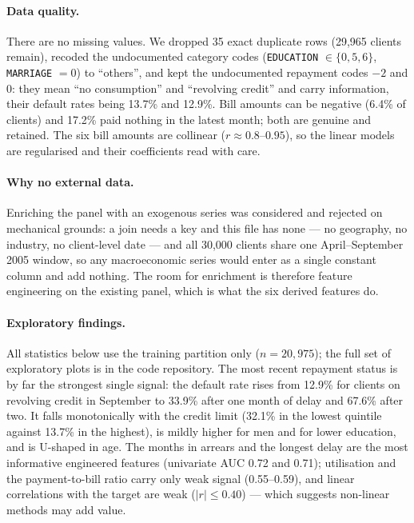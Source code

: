 \documentclass{article}
\begin{document}
\paragraph{Data quality.}
There are no missing values. We dropped 35 exact duplicate rows (29,965 clients
remain), recoded the undocumented category codes (\texttt{EDUCATION} $\in
\{0,5,6\}$, \texttt{MARRIAGE} $=0$) to ``others'', and kept the undocumented
repayment codes $-2$ and $0$: they mean ``no consumption'' and ``revolving
credit'' and carry information, their default rates being 13.7\% and 12.9\%. Bill
amounts can be negative (6.4\% of clients) and 17.2\% paid nothing in the latest
month; both are genuine and retained. The six bill amounts are collinear ($r
\approx 0.8$--$0.95$), so the linear models are regularised and their coefficients
read with care.

\paragraph{Why no external data.}
Enriching the panel with an exogenous series was considered and rejected on
mechanical grounds: a join needs a key and this file has none --- no geography, no
industry, no client-level date --- and all 30,000 clients share one
April--September 2005 window, so any macroeconomic series would enter as a single
constant column and add nothing. The room for enrichment is therefore feature
engineering on the existing panel, which is what the six derived features do.

\paragraph{Exploratory findings.}
All statistics below use the training partition only ($n = 20{,}975$); the full
set of exploratory plots is in the code repository. The most recent repayment status is by far the
strongest single signal: the default rate rises from 12.9\% for clients on
revolving credit in September to 33.9\% after one month of delay and 67.6\% after
two. It falls monotonically with the credit limit (32.1\% in the lowest quintile
against 13.7\% in the highest), is mildly higher for men and for lower education,
and is U-shaped in age. The months in arrears and the longest
delay are the most informative engineered features (univariate AUC 0.72 and 0.71);
utilisation and the payment-to-bill ratio carry only weak signal (0.55--0.59),
and linear correlations with the target are weak ($|r| \le 0.40$) --- which
suggests non-linear methods may add value.
\end{document}
